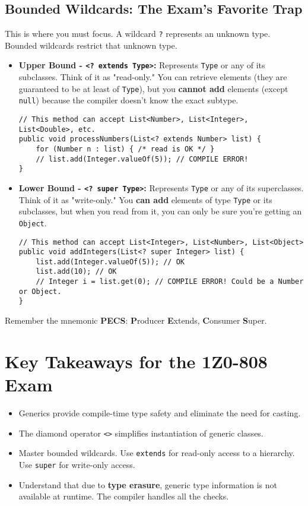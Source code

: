 \documentclass[12pt]{article}
\begin{document}
\begin{enumerate}[label=(\arabic*)]
\subsection{Bounded Wildcards: The Exam's Favorite Trap}
This is where you must focus. A wildcard \texttt{?} represents an unknown type. Bounded wildcards restrict that unknown type.
\begin{itemize}
    \item \textbf{Upper Bound - \texttt{<? extends Type>}:} Represents \texttt{Type} or any of its subclasses. Think of it as "read-only." You can retrieve elements (they are guaranteed to be at least of \texttt{Type}), but you \textbf{cannot add} elements (except \texttt{null}) because the compiler doesn't know the exact subtype.
\begin{verbatim}
// This method can accept List<Number>, List<Integer>, List<Double>, etc.
public void processNumbers(List<? extends Number> list) {
    for (Number n : list) { /* read is OK */ }
    // list.add(Integer.valueOf(5)); // COMPILE ERROR!
}
\end{verbatim}
    \item \textbf{Lower Bound - \texttt{<? super Type>}:} Represents \texttt{Type} or any of its superclasses. Think of it as "write-only." You \textbf{can add} elements of type \texttt{Type} or its subclasses, but when you read from it, you can only be sure you're getting an \texttt{Object}.
\begin{verbatim}
// This method can accept List<Integer>, List<Number>, List<Object>
public void addIntegers(List<? super Integer> list) {
    list.add(Integer.valueOf(5)); // OK
    list.add(10); // OK
    // Integer i = list.get(0); // COMPILE ERROR! Could be a Number or Object.
}
\end{verbatim}
\end{itemize}
Remember the mnemonic \textbf{PECS}: \textbf{P}roducer \textbf{E}xtends, \textbf{C}onsumer \textbf{S}uper.

\section*{Key Takeaways for the 1Z0-808 Exam}
\begin{itemize}
    \item Generics provide compile-time type safety and eliminate the need for casting.
    \item The diamond operator \texttt{<>} simplifies instantiation of generic classes.
    \item Master bounded wildcards. Use \texttt{extends} for read-only access to a hierarchy. Use \texttt{super} for write-only access.
    \item Understand that due to \textbf{type erasure}, generic type information is not available at runtime. The compiler handles all the checks.
\end{itemize}
\end{enumerate}
\end{document}
